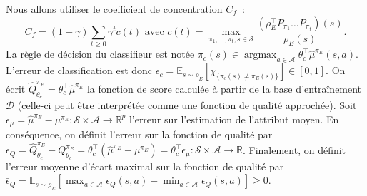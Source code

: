 \documentclass[english,utf8]{./hermes-journal}
\newcommand{\argmax}{\operatorname*{argmax}} %
\newcommand{\s}{\mathcal{S}}
\newcommand{\A}{\mathcal{A}}
\newcommand{\D}{\mathcal{D}}
\newcommand{\E}{\mathbb{E}}
\begin{document}
Nous allons utiliser le coefficient de concentration $C_f$~\cite{Munos:2007}:
\begin{equation}
  C_f = (1-\gamma)\sum_{t\geq 0} \gamma^t c(t) \text{ avec } c(t) =
  \max_{\pi_1,\dots,\pi_t,s\in\s}\frac{(\rho_E^\top P_{\pi_1}\dots
  P_{\pi_t})(s)}{\rho_E(s)}.
\end{equation}
La règle de décision du classifieur est notée $\pi_c(s) \in
\argmax_{a\in \A} \theta_c^\top\hat{\mu}^{\pi_E}(s,a)$. L'erreur de classification est donc $\epsilon_c =
\E_{s\sim\rho_E}[\chi_{\{\pi_c(s)\neq\pi_E(s)\}}] \in [0,1]$. On écrit $\hat{Q}^{\pi_E}_{\theta_c} = \theta_c^\top \hat{\mu}^{\pi_E}$ la fonction de score calculée à partir de la base d'entraînement $\D$ (celle-ci peut être interprétée comme une fonction de qualité approchée). Soit 
$\epsilon_{\mu} = \hat{\mu}^{\pi_E} - \mu^{\pi_E}:\s\times\A
\rightarrow  \mathbb{R}^p$ l'erreur sur l'estimation de l'attribut moyen.
En conséquence, on définit l'erreur sur la fonction de qualité par 
$\epsilon_Q = \hat{Q}^{\pi_E}_{\theta_c} - Q^{\pi_E}_{\theta_c} =
\theta_c^\top(\hat{\mu}^{\pi_E} - \mu^{\pi_E}) = \theta_c^\top
\epsilon_\mu:\s\times\A\rightarrow\mathbb{R}$. Finalement, on définit l'erreur moyenne d'écart maximal sur la fonction de qualité par $\bar{\epsilon}_Q =
\E_{s\sim\rho_E}[\max_{a\in\A}\epsilon_Q(s,a) -
\min_{a\in\A}\epsilon_Q(s,a)]\geq 0$.
\end{document}
